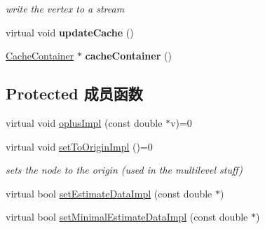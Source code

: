 \begin{DoxyCompactItemize}
\begin{DoxyCompactList}\small\item\em write the vertex to a stream \end{DoxyCompactList}\item 
\hypertarget{classg2o_1_1OptimizableGraph_1_1Vertex_ab5972c8ba6834c4dcb8a2319e9bf3070}{virtual void {\bfseries update\-Cache} ()}\label{classg2o_1_1OptimizableGraph_1_1Vertex_ab5972c8ba6834c4dcb8a2319e9bf3070}

\item 
\hypertarget{classg2o_1_1OptimizableGraph_1_1Vertex_ab381120a2c00fc8ae90e5c298dfbb967}{\hyperlink{classg2o_1_1CacheContainer}{Cache\-Container} $\ast$ {\bfseries cache\-Container} ()}\label{classg2o_1_1OptimizableGraph_1_1Vertex_ab381120a2c00fc8ae90e5c298dfbb967}

\end{DoxyCompactItemize}
\subsection*{Protected 成员函数}
\begin{DoxyCompactItemize}
\item 
virtual void \hyperlink{classg2o_1_1OptimizableGraph_1_1Vertex_a4537a46afb8d12c3f18c88ba9601c625}{oplus\-Impl} (const double $\ast$v)=0
\item 
\hypertarget{classg2o_1_1OptimizableGraph_1_1Vertex_abd5fe36815f27a9c174ad41c2070c247}{virtual void \hyperlink{classg2o_1_1OptimizableGraph_1_1Vertex_abd5fe36815f27a9c174ad41c2070c247}{set\-To\-Origin\-Impl} ()=0}\label{classg2o_1_1OptimizableGraph_1_1Vertex_abd5fe36815f27a9c174ad41c2070c247}

\begin{DoxyCompactList}\small\item\em sets the node to the origin (used in the multilevel stuff) \end{DoxyCompactList}\item 
virtual bool \hyperlink{classg2o_1_1OptimizableGraph_1_1Vertex_a35ab439967fd3a3d3e5608e3883d8487}{set\-Estimate\-Data\-Impl} (const double $\ast$)
\item 
virtual bool \hyperlink{classg2o_1_1OptimizableGraph_1_1Vertex_a088ecbdde86968f3896b2320f80ee396}{set\-Minimal\-Estimate\-Data\-Impl} (const double $\ast$)
\end{DoxyCompactItemize}
